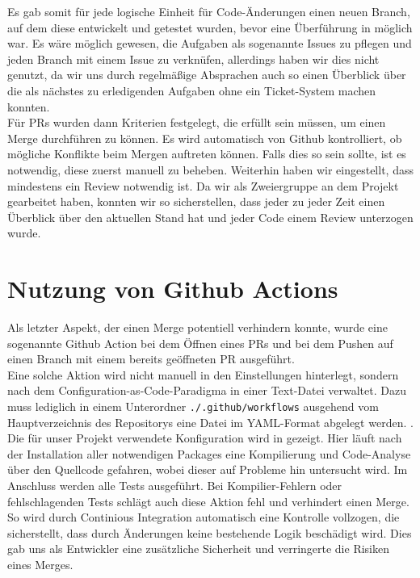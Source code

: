 Es gab somit für jede logische Einheit für Code-Änderungen einen neuen Branch, auf dem diese entwickelt und getestet
wurden, bevor eine Überführung in  möglich war.
Es wäre möglich gewesen, die Aufgaben als sogenannte Issues zu pflegen und jeden Branch mit einem Issue zu verknüfen,
allerdings haben wir dies nicht genutzt, da wir uns durch regelmäßige Absprachen auch so einen Überblick über die
als nächstes zu erledigenden Aufgaben ohne ein Ticket-System machen konnten. \\

Für \ac{PR}s wurden dann Kriterien festgelegt, die erfüllt sein müssen, um einen Merge durchführen zu können.
Es wird automatisch von Github kontrolliert, ob mögliche Konflikte beim Mergen auftreten können.
Falls dies so sein sollte, ist es notwendig, diese zuerst manuell zu beheben.
Weiterhin haben wir eingestellt, dass mindestens ein Review notwendig ist.
Da wir als Zweiergruppe an dem Projekt gearbeitet haben, konnten wir so sicherstellen, dass jeder zu jeder Zeit einen
Überblick über den aktuellen Stand hat und jeder Code einem Review unterzogen wurde.

\section{Nutzung von Github Actions}
\label{sec:github-actions}

Als letzter Aspekt, der einen Merge potentiell verhindern konnte, wurde eine sogenannte Github Action bei dem Öffnen
eines \ac{PR}s und bei dem Pushen auf einen Branch mit einem bereits geöffneten \ac{PR} ausgeführt. \\

Eine solche Aktion wird nicht manuell in den Einstellungen hinterlegt, sondern nach dem
Configuration-as-Code-Paradigma in einer Text-Datei verwaltet.
Dazu muss lediglich in einem Unterordner \texttt{./.github/workflows} ausgehend vom Hauptverzeichnis des Repositorys
eine Datei im YAML-Format abgelegt werden.  . \\

Die für unser Projekt verwendete Konfiguration wird in  gezeigt.
Hier läuft nach der Installation aller notwendigen Packages eine Kompilierung und Code-Analyse über den
Quellcode gefahren, wobei dieser auf Probleme hin untersucht wird.
Im Anschluss werden alle Tests ausgeführt.
Bei Kompilier-Fehlern oder fehlschlagenden Tests schlägt auch diese Aktion fehl und verhindert einen Merge. \\

So wird durch Continious Integration automatisch eine Kontrolle vollzogen, die sicherstellt, dass durch Änderungen
keine bestehende Logik beschädigt wird.
Dies gab uns als Entwickler eine zusätzliche Sicherheit und verringerte die Risiken eines Merges.